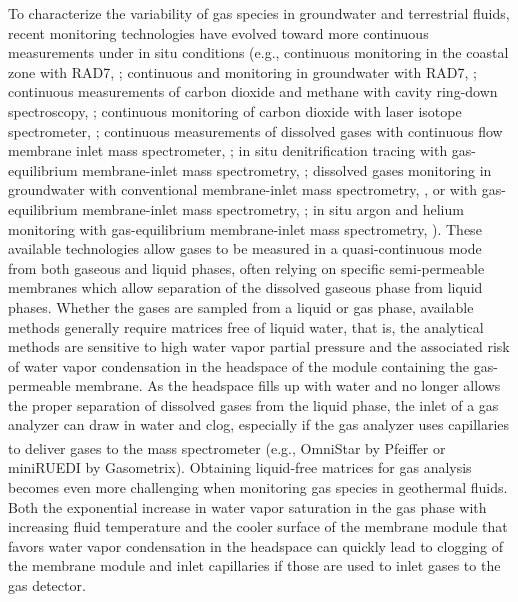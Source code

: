 To characterize the variability of gas species in groundwater and terrestrial fluids, recent monitoring technologies have evolved toward more continuous measurements under in situ conditions (e.g., continuous  monitoring in the coastal zone with RAD7, \cite{burnett2001radon}; continuous  and  monitoring in groundwater with RAD7, \cite{huxol2012radon}; continuous measurements of carbon dioxide and methane with cavity ring-down spectroscopy, \cite{chen2010picarro}; continuous monitoring of carbon dioxide with laser isotope spectrometer, \cite{frank2020co2}; continuous measurements of dissolved gases with continuous flow membrane inlet mass spectrometer, \cite{chatton2017continuous}; in situ denitrification tracing with gas-equilibrium membrane-inlet mass spectrometry, \cite{popp2020denitrifaction}; dissolved gases monitoring in groundwater with conventional membrane-inlet mass spectrometry, \cite{takahata1997continuous}, or with gas-equilibrium membrane-inlet mass spectrometry, \cite{maechler2013miniruedi}; in situ argon and helium monitoring with gas-equilibrium membrane-inlet mass spectrometry, \cite{roques2020helium}).
These available technologies allow gases to be measured in a quasi-continuous mode from both gaseous and liquid phases, often relying on specific semi-permeable membranes which allow separation of the dissolved gaseous phase from liquid phases. 
Whether the gases are sampled from a liquid or gas phase, available methods generally require matrices free of liquid water, that is, the analytical methods are sensitive to high water vapor partial pressure and the associated risk of water vapor condensation in the headspace of the module containing the gas-permeable membrane.
As the headspace fills up with water and no longer allows the proper separation of dissolved gases from the liquid phase, the inlet of a gas analyzer can draw in water and clog, especially if the gas analyzer uses capillaries to deliver gases to the mass spectrometer (e.g., OmniStar\textsuperscript{\tiny\textregistered} by Pfeiffer or miniRUEDI by Gasometrix).
Obtaining liquid-free matrices for gas analysis becomes even more challenging when monitoring gas species in geothermal fluids.
Both the exponential increase in water vapor saturation in the gas phase with increasing fluid temperature and the cooler surface of the membrane module that favors water vapor condensation in the headspace can quickly lead to clogging of the membrane module and inlet capillaries if those are used to inlet gases to the gas detector.

